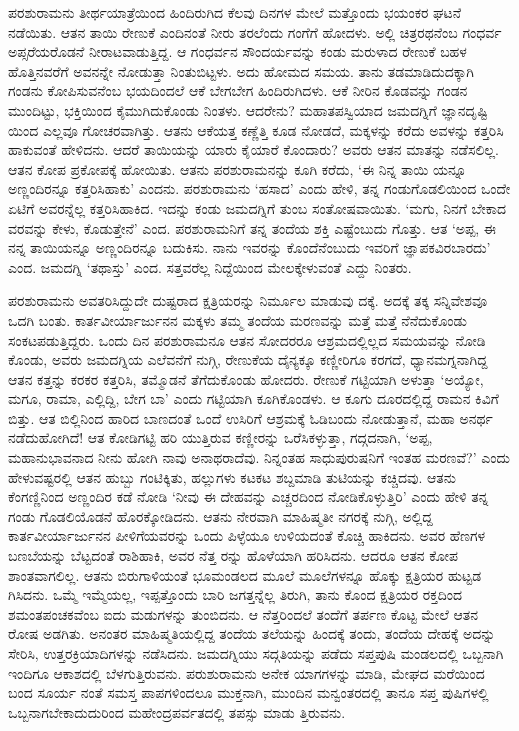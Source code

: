 ಪರಶುರಾಮನು ತೀರ್ಥಯಾತ್ರೆಯಿಂದ ಹಿಂದಿರುಗಿದ ಕೆಲವು ದಿನಗಳ ಮೇಲೆ ಮತ್ತೊಂದು ಭಯಂಕರ ಘಟನೆ ನಡೆಯಿತು. ಆತನ ತಾಯಿ ರೇಣುಕೆ ಎಂದಿನಂತೆ ನೀರು ತರಲೆಂದು ಗಂಗೆಗೆ ಹೋದಳು. ಅಲ್ಲಿ ಚಿತ್ರರಥನೆಂಬ ಗಂಧರ್ವ ಅಪ್ಸರೆಯರೊಡನೆ ನೀರಾಟವಾಡುತ್ತಿದ್ದ. ಆ ಗಂಧರ್ವನ ಸೌಂದರ್ಯವನ್ನು ಕಂಡು ಮರುಳಾದ ರೇಣುಕೆ ಬಹಳ ಹೊತ್ತಿನವರೆಗೆ ಅವನನ್ನೇ ನೋಡುತ್ತಾ ನಿಂತುಬಿಟ್ಟಳು. ಅದು ಹೋಮದ ಸಮಯ. ತಾನು ತಡಮಾಡಿದುದಕ್ಕಾಗಿ ಗಂಡನು ಕೋಪಿಸುವನೆಂಬ ಭಯದಿಂದಲೆ ಆಕೆ ಬೇಗಬೇಗ ಹಿಂದಿರುಗಿದಳು. ಆಕೆ ನೀರಿನ ಕೊಡವನ್ನು ಗಂಡನ ಮುಂದಿಟ್ಟು, ಭಕ್ತಿಯಿಂದ ಕೈಮುಗಿದುಕೊಂಡು ನಿಂತಳು. ಆದರೇನು? ಮಹಾತಪಸ್ವಿಯಾದ ಜಮದಗ್ನಿಗೆ ಜ್ಞಾನದೃಷ್ಟಿ ಯಿಂದ ಎಲ್ಲವೂ ಗೋಚರವಾಗಿತ್ತು. ಆತನು ಆಕೆಯತ್ತ ಕಣ್ಣೆತ್ತಿ ಕೂಡ ನೋಡದೆ, ಮಕ್ಕಳನ್ನು ಕರೆದು ಅವಳನ್ನು ಕತ್ತರಿಸಿ ಹಾಕುವಂತೆ ಹೇಳಿದನು. ಆದರೆ ತಾಯಿಯನ್ನು ಯಾರು ಕೈಯಾರೆ ಕೊಂದಾರು? ಅವರು ಆತನ ಮಾತನ್ನು ನಡೆಸಲಿಲ್ಲ. ಆತನ ಕೋಪ ಪ್ರಕೋಪಕ್ಕೆ ಹೋಯಿತು. ಆತನು ಪರಶುರಾಮನನ್ನು ಕೂಗಿ ಕರೆದು, ‘ಈ ನಿನ್ನ ತಾಯಿ ಯನ್ನೂ ಅಣ್ಣಂದಿರನ್ನೂ ಕತ್ತರಿಸಿಹಾಕು’ ಎಂದನು. ಪರಶುರಾಮನು ‘ಹಸಾದ’ ಎಂದು ಹೇಳಿ, ತನ್ನ ಗಂಡುಗೊಡಲಿಯಿಂದ ಒಂದೇ ಏಟಿಗೆ ಅವರನ್ನೆಲ್ಲ ಕತ್ತರಿಸಿಹಾಕಿದ. ಇದನ್ನು ಕಂಡು ಜಮದಗ್ನಿಗೆ ತುಂಬ ಸಂತೋಷವಾಯಿತು. ‘ಮಗು, ನಿನಗೆ ಬೇಕಾದ ವರವನ್ನು ಕೇಳು, ಕೊಡುತ್ತೇನೆ’ ಎಂದ. ಪರಶುರಾಮನಿಗೆ ತನ್ನ ತಂದೆಯ ಶಕ್ತಿ ಎಷ್ಟೆಂಬುದು ಗೊತ್ತು. ಆತ ‘ಅಪ್ಪ, ಈ ನನ್ನ ತಾಯಿಯನ್ನೂ ಅಣ್ಣಂದಿರನ್ನೂ ಬದುಕಿಸು. ನಾನು ಇವರನ್ನು ಕೊಂದೆನೆಂಬುದು ಇವರಿಗೆ ಜ್ಞಾಪಕವಿರಬಾರದು’ ಎಂದ. ಜಮದಗ್ನಿ ‘ತಥಾಸ್ತು’ ಎಂದ. ಸತ್ತವರೆಲ್ಲ ನಿದ್ದೆಯಿಂದ ಮೇಲಕ್ಕೇಳುವಂತೆ ಎದ್ದು ನಿಂತರು.

ಪರಶುರಾಮನು ಅವತರಿಸಿದ್ದುದೇ ದುಷ್ಟರಾದ ಕ್ಷತ್ರಿಯರನ್ನು ನಿರ್ಮೂಲ ಮಾಡುವು ದಕ್ಕೆ. ಅದಕ್ಕೆ ತಕ್ಕ ಸನ್ನಿವೇಶವೂ ಒದಗಿ ಬಂತು. ಕಾರ್ತವೀರ್ಯಾರ್ಜುನನ ಮಕ್ಕಳು ತಮ್ಮ ತಂದೆಯ ಮರಣವನ್ನು ಮತ್ತೆ ಮತ್ತೆ ನೆನೆದುಕೊಂಡು ಸಂಕಟಪಡುತ್ತಿದ್ದರು. ಒಂದು ದಿನ ಪರಶುರಾಮನೂ ಆತನ ಸೋದರರೂ ಆಶ್ರಮದಲ್ಲಿಲ್ಲದ ಸಮಯವನ್ನು ನೋಡಿ ಕೊಂಡು, ಅವರು ಜಮದಗ್ನಿಯ ಎಲೆವನೆಗೆ ನುಗ್ಗಿ, ರೇಣುಕೆಯ ದೈನ್ಯಕ್ಕೂ ಕಣ್ಣೀರಿಗೂ ಕರಗದೆ, ಧ್ಯಾನಮಗ್ನನಾಗಿದ್ದ ಆತನ ಕತ್ತನ್ನು ಕರಕರ ಕತ್ತರಿಸಿ, ತಮ್ಮೊಡನೆ ತೆಗೆದುಕೊಂಡು ಹೋದರು. ರೇಣುಕೆ ಗಟ್ಟಿಯಾಗಿ ಅಳುತ್ತಾ ‘ಅಯ್ಯೋ, ಮಗೂ, ರಾಮಾ, ಎಲ್ಲಿದ್ದಿ, ಬೇಗ ಬಾ’ ಎಂದು ಗಟ್ಟಿಯಾಗಿ ಕೂಗಿಕೊಂಡಳು. ಆ ಕೂಗು ದೂರದಲ್ಲಿದ್ದ ರಾಮನ ಕಿವಿಗೆ ಬಿತ್ತು. ಆತ ಬಿಲ್ಲಿನಿಂದ ಹಾರಿದ ಬಾಣದಂತೆ ಒಂದೆ ಉಸಿರಿಗೆ ಆಶ್ರಮಕ್ಕೆ ಓಡಿಬಂದು ನೋಡುತ್ತಾನೆ, ಮಹಾ ಅನರ್ಥ ನಡೆದುಹೋಗಿದೆ! ಆತ ಕೋಡಿಗಟ್ಟಿ ಹರಿ ಯುತ್ತಿರುವ ಕಣ್ಣೀರನ್ನು ಒರೆಸಿಕಳ್ಳುತ್ತಾ, ಗದ್ಗದನಾಗಿ, ‘ಅಪ್ಪ, ಮಹಾನುಭಾವನಾದ ನೀನು ಹೋಗಿ ನಾವು ಅನಾಥರಾದೆವು. ನಿನ್ನಂತಹ ಸಾಧುಪುರುಷನಿಗೆ ಇಂತಹ ಮರಣವೆ?’ ಎಂದು ಹೇಳುವಷ್ಟರಲ್ಲಿ ಆತನ ಹುಬ್ಬು ಗಂಟಿಕ್ಕಿತು, ಹಲ್ಲುಗಳು ಕಟಕಟ ಶಬ್ದಮಾಡಿ ತುಟಿಯನ್ನು ಕಚ್ಚಿದವು. ಆತನು ಕೆಂಗಣ್ಣಿನಿಂದ ಅಣ್ಣಂದಿರ ಕಡೆ ನೋಡಿ ‘ನೀವು ಈ ದೇಹವನ್ನು ಎಚ್ಚರದಿಂದ ನೋಡಿಕೊಳ್ಳುತ್ತಿರಿ’ ಎಂದು ಹೇಳಿ ತನ್ನ ಗಂಡು ಗೊಡಲಿಯೊಡನೆ ಹೊರಕ್ಕೋಡಿದನು. ಆತನು ನೇರವಾಗಿ ಮಾಹಿಷ್ಮತೀ ನಗರಕ್ಕೆ ನುಗ್ಗಿ, ಅಲ್ಲಿದ್ದ ಕಾರ್ತವೀರ್ಯಾರ್ಜುನನ ಪೀಳಿಗೆಯವರನ್ನು ಒಂದು ಪಿಳ್ಳೆಯೂ ಉಳಿಯದಂತೆ ಕೊಚ್ಚಿ ಹಾಕಿದನು. ಅವರ ಹೆಣಗಳ ಬಣಬೆಯನ್ನು ಬೆಟ್ಟದಂತೆ ರಾಶಿಹಾಕಿ, ಅವರ ನೆತ್ತ ರನ್ನು ಹೊಳೆಯಾಗಿ ಹರಿಸಿದನು. ಆದರೂ ಆತನ ಕೋಪ ಶಾಂತವಾಗಲಿಲ್ಲ. ಆತನು ಬಿರುಗಾಳಿಯಂತೆ ಭೂಮಂಡಲದ ಮೂಲೆ ಮೂಲೆಗಳನ್ನೂ ಹೊಕ್ಕು ಕ್ಷತ್ರಿಯರ ಹುಟ್ಟಡ ಗಿಸಿದನು. ಒಮ್ಮೆ ಇಮ್ಮೆಯಲ್ಲ, ಇಪ್ಪತ್ತೊಂದು ಬಾರಿ ಜಗತ್ತನ್ನೆಲ್ಲ ತಿರುಗಿ, ತಾನು ಕೊಂದ ಕ್ಷತ್ರಿಯರ ರಕ್ತದಿಂದ ಶಮಂತಪಂಚಕವೆಂಬ ಐದು ಮಡುಗಳನ್ನು ತುಂಬಿದನು. ಆ ನೆತ್ತರಿಂದಲೆ ತಂದೆಗೆ ತರ್ಪಣ ಕೊಟ್ಟ ಮೇಲೆ ಆತನ ರೋಷ ಅಡಗಿತು. ಅನಂತರ ಮಾಹಿಷ್ಮತಿಯಲ್ಲಿದ್ದ ತಂದೆಯ ತಲೆಯನ್ನು ಹಿಂದಕ್ಕೆ ತಂದು, ತಂದೆಯ ದೇಹಕ್ಕೆ ಅದನ್ನು ಸೇರಿಸಿ, ಉತ್ತರಕ್ರಿಯಾದಿಗಳನ್ನು ನಡೆಸಿದನು. ಜಮದಗ್ನಿಯು ಸದ್ಗತಿಯನ್ನು ಪಡೆದು ಸಪ್ತಪುಷಿ ಮಂಡಲದಲ್ಲಿ ಒಬ್ಬನಾಗಿ ಇಂದಿಗೂ ಆಕಾಶದಲ್ಲಿ ಬೆಳಗುತ್ತಿರುವನು. ಪರುಶುರಾಮನು ಅನೇಕ ಯಾಗಗಳನ್ನು ಮಾಡಿ, ಮೇಘದ ಮರೆಯಿಂದ ಬಂದ ಸೂರ್ಯ ನಂತೆ ಸಮಸ್ತ ಪಾಪಗಳಿಂದಲೂ ಮುಕ್ತನಾಗಿ, ಮುಂದಿನ ಮನ್ವಂತರದಲ್ಲಿ ತಾನೂ ಸಪ್ತ ಪುಷಿಗಳಲ್ಲಿ ಒಬ್ಬನಾಗಬೇಕಾದುದುರಿಂದ ಮಹೇಂದ್ರಪರ್ವತದಲ್ಲಿ ತಪಸ್ಸು ಮಾಡು ತ್ತಿರುವನು.

